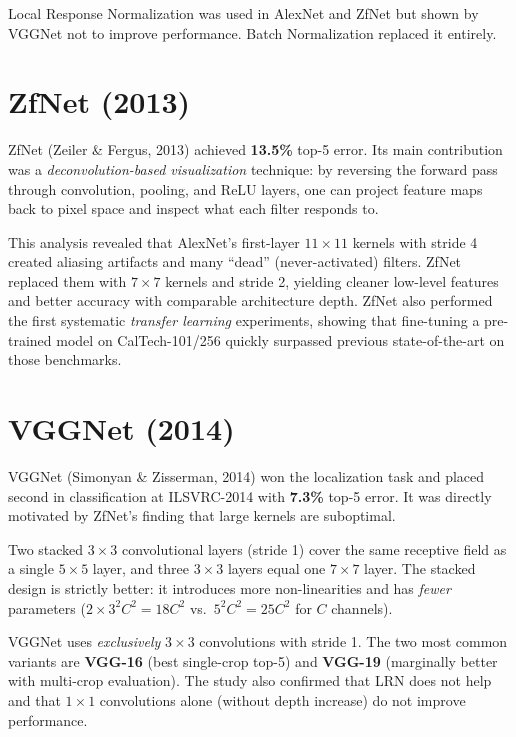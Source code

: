 \documentclass[11pt, oneside]{book}
\begin{document}
\begin{notebox}[title={LRN is obsolete}]
Local Response Normalization was used in AlexNet and ZfNet but shown by VGGNet
not to improve performance. Batch Normalization replaced it entirely.
\end{notebox}

\section{ZfNet (2013)}

ZfNet (Zeiler \& Fergus, 2013) achieved \textbf{13.5\%} top-5 error.
Its main contribution was a \emph{deconvolution-based visualization} technique:
by reversing the forward pass through convolution, pooling, and ReLU layers,
one can project feature maps back to pixel space and inspect what each filter responds to.

This analysis revealed that AlexNet's first-layer $11\times11$ kernels with stride 4
created aliasing artifacts and many ``dead'' (never-activated) filters.
ZfNet replaced them with $7\times7$ kernels and stride 2,
yielding cleaner low-level features and better accuracy with comparable architecture depth.
ZfNet also performed the first systematic \emph{transfer learning} experiments,
showing that fine-tuning a pre-trained model on CalTech-101/256
quickly surpassed previous state-of-the-art on those benchmarks.

\section{VGGNet (2014)}

VGGNet (Simonyan \& Zisserman, 2014) won the localization task and placed second in
classification at ILSVRC-2014 with \textbf{7.3\%} top-5 error.
It was directly motivated by ZfNet's finding that large kernels are suboptimal.

\begin{thmbox}[title={Receptive-Field Equivalence of Stacked $3\times3$ Kernels}]
Two stacked $3\times3$ convolutional layers (stride 1) cover the same receptive field as
a single $5\times5$ layer, and three $3\times3$ layers equal one $7\times7$ layer.
The stacked design is strictly better: it introduces more non-linearities and has
\emph{fewer} parameters
($2 \times 3^2 C^2 = 18C^2$ vs.\ $5^2 C^2 = 25C^2$ for $C$ channels).
\end{thmbox}

VGGNet uses \emph{exclusively} $3\times3$ convolutions with stride 1.
The two most common variants are \textbf{VGG-16} (best single-crop top-5)
and \textbf{VGG-19} (marginally better with multi-crop evaluation).
The study also confirmed that LRN does not help and that $1\times1$ convolutions
alone (without depth increase) do not improve performance.
\end{document}
